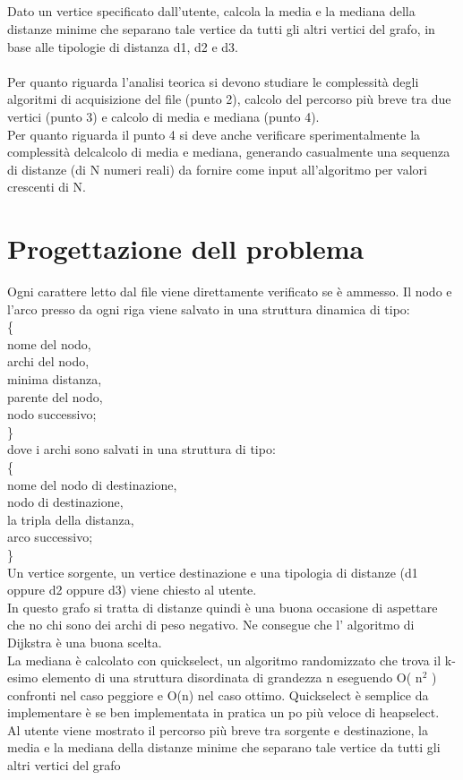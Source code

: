 \documentclass[11pt, a4paper, titlepage, block]{article}
\begin{document}
	\subsection{}
	Dato un vertice specificato dall’utente, calcola la media e la mediana della distanze minime che separano tale vertice da tutti gli altri vertici del grafo, in base alle tipologie di distanza d1, d2 e d3.\\ \\
	Per quanto riguarda l’analisi teorica si devono studiare le complessit\`{a} degli algoritmi di acquisizione del file (punto 2), calcolo del percorso pi\`{u} breve tra due vertici (punto 3) e calcolo di media e mediana (punto 4).\\
	Per quanto riguarda il punto 4 si deve anche verificare sperimentalmente la complessit\`{a} delcalcolo di media e mediana, generando casualmente una sequenza di distanze (di N numeri reali) da fornire come input all’algoritmo per valori crescenti di N.

	\newpage
\section{Progettazione dell problema}
Ogni carattere letto dal file viene direttamente verificato se \`{e} ammesso. Il nodo e l'arco presso da ogni riga viene salvato in una struttura dinamica di tipo: \\
\{\\
\indent nome del nodo,\\
\indent archi del nodo,\\
\indent minima distanza,\\
\indent parente del nodo,\\
\indent nodo successivo; \\
\}\\
dove i archi sono salvati in una struttura di tipo:\\
\{\\
  nome del nodo di destinazione,\\
  nodo di destinazione,\\
  la tripla della distanza,\\
  arco successivo;\\
\}\\
Un vertice sorgente, un vertice destinazione e una tipologia di distanze (d1 oppure d2 oppure d3) viene chiesto al utente.\\
In questo grafo si tratta di distanze quindi è una buona occasione di aspettare che no chi sono dei archi di peso negativo. Ne consegue che l' algoritmo di Dijkstra è una buona scelta.\\
La mediana è calcolato con quickselect, un algoritmo randomizzato che trova il k-esimo elemento di una struttura disordinata di grandezza n eseguendo O( n$^2$ ) confronti nel caso peggiore e O(n) nel caso ottimo. Quickselect è semplice da implementare è se ben implementata in pratica un po più veloce di heapselect.\\
Al utente viene mostrato il percorso pi\`{u} breve tra sorgente e destinazione, la media e la mediana della distanze minime che separano tale vertice da tutti gli altri vertici del grafo
	\newpage
\end{document}
